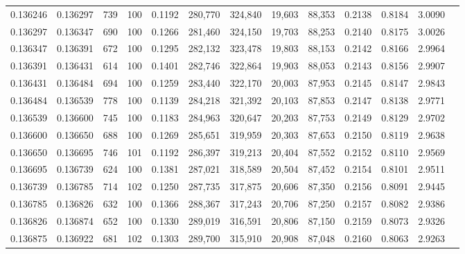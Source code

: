 \begin{tabular}{rrrrrrrrrrrrr}
0.136246 & 0.136297 &   739 & 100 &                                     0.1192 & 280,770 & 324,840 &  19,603 &  88,353 & 0.2138 & 0.8184 & 3.0090 \\
0.136297 & 0.136347 &   690 & 100 &                                     0.1266 & 281,460 & 324,150 &  19,703 &  88,253 & 0.2140 & 0.8175 & 3.0026 \\
0.136347 & 0.136391 &   672 & 100 &                                     0.1295 & 282,132 & 323,478 &  19,803 &  88,153 & 0.2142 & 0.8166 & 2.9964 \\
0.136391 & 0.136431 &   614 & 100 &                                     0.1401 & 282,746 & 322,864 &  19,903 &  88,053 & 0.2143 & 0.8156 & 2.9907 \\
0.136431 & 0.136484 &   694 & 100 &                                     0.1259 & 283,440 & 322,170 &  20,003 &  87,953 & 0.2145 & 0.8147 & 2.9843 \\
0.136484 & 0.136539 &   778 & 100 &                                     0.1139 & 284,218 & 321,392 &  20,103 &  87,853 & 0.2147 & 0.8138 & 2.9771 \\
0.136539 & 0.136600 &   745 & 100 &                                     0.1183 & 284,963 & 320,647 &  20,203 &  87,753 & 0.2149 & 0.8129 & 2.9702 \\
0.136600 & 0.136650 &   688 & 100 &                                     0.1269 & 285,651 & 319,959 &  20,303 &  87,653 & 0.2150 & 0.8119 & 2.9638 \\
0.136650 & 0.136695 &   746 & 101 &                                     0.1192 & 286,397 & 319,213 &  20,404 &  87,552 & 0.2152 & 0.8110 & 2.9569 \\
0.136695 & 0.136739 &   624 & 100 &                                     0.1381 & 287,021 & 318,589 &  20,504 &  87,452 & 0.2154 & 0.8101 & 2.9511 \\
0.136739 & 0.136785 &   714 & 102 &                                     0.1250 & 287,735 & 317,875 &  20,606 &  87,350 & 0.2156 & 0.8091 & 2.9445 \\
0.136785 & 0.136826 &   632 & 100 &                                     0.1366 & 288,367 & 317,243 &  20,706 &  87,250 & 0.2157 & 0.8082 & 2.9386 \\
0.136826 & 0.136874 &   652 & 100 &                                     0.1330 & 289,019 & 316,591 &  20,806 &  87,150 & 0.2159 & 0.8073 & 2.9326 \\
0.136875 & 0.136922 &   681 & 102 &                                     0.1303 & 289,700 & 315,910 &  20,908 &  87,048 & 0.2160 & 0.8063 & 2.9263 \\

\end{tabular}
